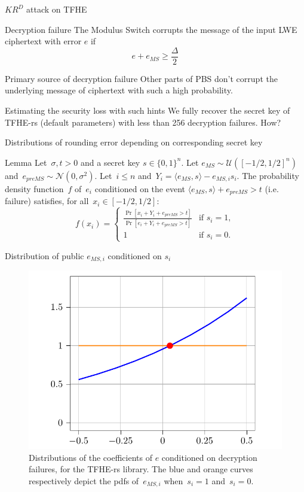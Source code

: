 \documentclass{beamer}
\begin{document}
	
	\begin{frame}{$KR^D$ attack on TFHE}
		\begin{block}{Decryption failure}
			The Modulus Switch corrupts the message of the input LWE ciphertext with error $e$ if
			\[e+e_{MS} \geq \frac{\Delta}{2}\]
		\end{block}
		\begin{block}{Primary source of decryption failure}
			Other parts of PBS don't corrupt the underlying message of ciphertext with such a high probability.
		\end{block}
		\begin{block}{Estimating the security loss with such hints}
			We fully recover the secret key of TFHE-rs (default parameters) with less than 256 decryption failures. How?
		\end{block}
	\end{frame}

	\begin{frame}{Distributions of rounding error depending on corresponding secret key}
		\begin{block}{Lemma}
			Let~$\sigma,t>0$ and a secret key $s \in \{0,1\}^n$. Let $e_{MS} \sim \mathcal{U}([-1/2, 1/2]^n)$ 
			and~$e_{preMS} \sim \mathcal{N}(0, \sigma^2)$. Let~$i \leq n$ and~$Y_i = \langle e_{MS}, s \rangle - e_{MS, i} s_i$.
			The probability density function~$f$ of~$e_i$ conditioned on the event $\langle e_{MS}, s \rangle + e_{preMS} > t$ (i.e. failure) satisfies, for all~$x_i \in [-1/2,1/2]$: 
			\[
			f(x_i) = \left\{
			\begin{array}{ll}
				\frac{\Pr[x_i + Y_i + e_{preMS} > t]}{\Pr[  e_i + Y_i + e_{preMS} > t]}& \text{if } s_i=1, \\
				1& \text{if } s_i = 0.
			\end{array}\right.\]
		\end{block}
	\end{frame}

	\begin{frame}{Distribution of public $e_{MS, i}$ conditioned on $s_i$}
		\begin{figure}[h]
			\centering

			\caption{Distributions of the coefficients of $e$ conditioned on decryption failures, for the TFHE-rs library. The blue and orange curves respectively  depict the pdfs of~$e_{MS, i}$ when~$s_i=1$ and~$s_i=0$.
			}
			\includegraphics[width=0.7\linewidth]{krd_core.png}
		\end{figure}
	\end{frame}
\end{document}

